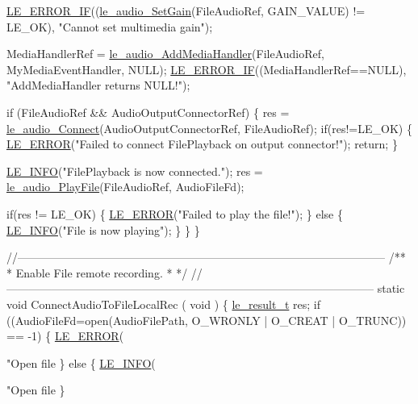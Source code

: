 \begin{DoxyCodeInclude}
{{{{{{{    \hyperlink{le__log_8h_aceaf11a11691d6c676e36dd317b38dbd}{LE\_ERROR\_IF}((\hyperlink{le__audio__interface_8h_a65f11540e6af03a3494b6b9be76ba5fc}{le\_audio\_SetGain}(FileAudioRef, GAIN\_VALUE) != LE\_OK), \textcolor{stringliteral}{"Cannot
       set multimedia gain"});

    MediaHandlerRef = \hyperlink{le__audio__interface_8h_a9996ac9d23333cf8219f28b69cac4f81}{le\_audio\_AddMediaHandler}(FileAudioRef, MyMediaEventHandler, 
      NULL);
    \hyperlink{le__log_8h_aceaf11a11691d6c676e36dd317b38dbd}{LE\_ERROR\_IF}((MediaHandlerRef==NULL), \textcolor{stringliteral}{"AddMediaHandler returns NULL!"});

    \textcolor{keywordflow}{if} (FileAudioRef && AudioOutputConnectorRef)
    \{
        res = \hyperlink{le__audio__interface_8h_a338df65b2fb1ae0140d86880adbcf0de}{le\_audio\_Connect}(AudioOutputConnectorRef, FileAudioRef);
        \textcolor{keywordflow}{if}(res!=LE\_OK)
        \{
            \hyperlink{le__log_8h_a353590f91b3143a7ba3a416ae5a50c3d}{LE\_ERROR}(\textcolor{stringliteral}{"Failed to connect FilePlayback on output connector!"});
            \textcolor{keywordflow}{return};
        \}

        \hyperlink{le__log_8h_a23e6d206faa64f612045d688cdde5808}{LE\_INFO}(\textcolor{stringliteral}{"FilePlayback is now connected."});
        res = \hyperlink{le__audio__interface_8h_aea2c5d0b394cfab87503639c534300c9}{le\_audio\_PlayFile}(FileAudioRef, AudioFileFd);

        \textcolor{keywordflow}{if}(res != LE\_OK)
        \{
            \hyperlink{le__log_8h_a353590f91b3143a7ba3a416ae5a50c3d}{LE\_ERROR}(\textcolor{stringliteral}{"Failed to play the file!"});
        \}
        \textcolor{keywordflow}{else}
        \{
            \hyperlink{le__log_8h_a23e6d206faa64f612045d688cdde5808}{LE\_INFO}(\textcolor{stringliteral}{"File is now playing"});
        \}
    \}
\}

\textcolor{comment}{//--------------------------------------------------------------------------------------------------}\textcolor{comment}{}
\textcolor{comment}{/**}
\textcolor{comment}{ * Enable File remote recording.}
\textcolor{comment}{ *}
\textcolor{comment}{ */}
\textcolor{comment}{//--------------------------------------------------------------------------------------------------}
\textcolor{keyword}{static} \textcolor{keywordtype}{void} ConnectAudioToFileLocalRec
(
    \textcolor{keywordtype}{void}
)
\{
    \hyperlink{le__basics_8h_a1cca095ed6ebab24b57a636382a6c86c}{le\_result\_t} res;
    \textcolor{keywordflow}{if} ((AudioFileFd=open(AudioFilePath, O\_WRONLY | O\_CREAT | O\_TRUNC)) == -1)
    \{
        \hyperlink{le__log_8h_a353590f91b3143a7ba3a416ae5a50c3d}{LE\_ERROR}(\textcolor{stringliteral}{"Open file %
    \}
    \textcolor{keywordflow}{else}
    \{
        \hyperlink{le__log_8h_a23e6d206faa64f612045d688cdde5808}{LE\_INFO}(\textcolor{stringliteral}{"Open file %
    \}

}}}}}}}}}
\end{DoxyCodeInclude}
